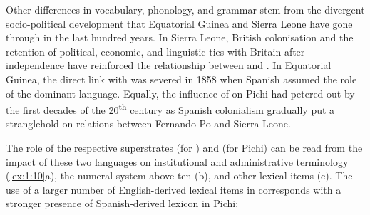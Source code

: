 Other differences in vocabulary, phonology, and grammar stem from the divergent socio-political development that Equatorial Guinea and Sierra Leone have gone through in the last hundred years. In Sierra Leone, British colonisation and the retention of political, economic, and linguistic ties with Britain after independence have reinforced the relationship between  and . In Equatorial Guinea, the direct link with  was severed in 1858 when Spanish assumed the role of the dominant language. Equally, the influence of  on Pichi had petered out by the first decades of the 20\textsuperscript{th} century as Spanish colonialism gradually put a stranglehold on relations between Fernando Po and Sierra Leone. 

The role of the respective superstrates  (for ) and  (for Pichi) can be read from the impact of these two languages on institutional and administrative terminology (\ref{ex:1:10}a), the numeral system above ten (b), and other lexical items (c). The use of a larger number of English-derived lexical items in  corresponds with a stronger presence of Spanish-derived lexicon in Pichi:

